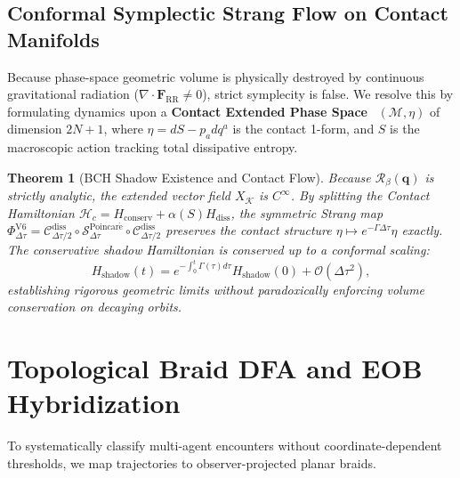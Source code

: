 \documentclass[11pt,a4paper,reqno]{article}
\theoremstyle{plain}
\newtheorem{theorem}{Theorem}[section]
\theoremstyle{definition}
\theoremstyle{remark}
\numberwithin{equation}{section}
\begin{document}
\subsection{Conformal Symplectic Strang Flow on Contact Manifolds}
Because phase-space geometric volume is physically destroyed by continuous gravitational radiation ($\nabla \cdot \bm{F}_{\mathrm{RR}} \ne 0$), strict symplecity is false. We resolve this by formulating dynamics upon a \textbf{Contact Extended Phase Space}~\cite{Bravetti2017} $(\mathcal{M}, \eta)$ of dimension $2N+1$, where $\eta = dS - p_a dq^a$ is the contact 1-form, and $S$ is the macroscopic action tracking total dissipative entropy.

\begin{theorem}[BCH Shadow Existence and Contact Flow]
Because $\mathcal{R}_\beta(\bm{q})$ is strictly analytic, the extended vector field $X_{\mathcal{K}}$ is $C^\infty$. By splitting the Contact Hamiltonian $\mathcal{H}_c = H_{\mathrm{conserv}} + \alpha(S) H_{\mathrm{diss}}$, the symmetric Strang map $\Phi_{\Delta \tau}^{\mathrm{V6}} = \mathcal{C}_{\Delta \tau/2}^{\mathrm{diss}} \circ \mathcal{S}_{\Delta \tau}^{\mathrm{Poincar\acute{e}}} \circ \mathcal{C}_{\Delta \tau/2}^{\mathrm{diss}}$ preserves the contact structure $\eta \mapsto e^{-\Gamma \Delta \tau} \eta$ exactly. The conservative shadow Hamiltonian is conserved up to a conformal scaling:
\begin{equation}
H_{\mathrm{shadow}}(t) = e^{-\int_0^t \Gamma(\tau) d\tau} H_{\mathrm{shadow}}(0) + \mathcal{O}(\Delta \tau^2),
\end{equation}
establishing rigorous geometric limits without paradoxically enforcing volume conservation on decaying orbits.
\end{theorem}

\bigskip

\section{Topological Braid DFA and EOB Hybridization}
\label{sec:automaton}

To systematically classify multi-agent encounters without coordinate-dependent thresholds, we map trajectories to observer-projected planar braids.
\end{document}
